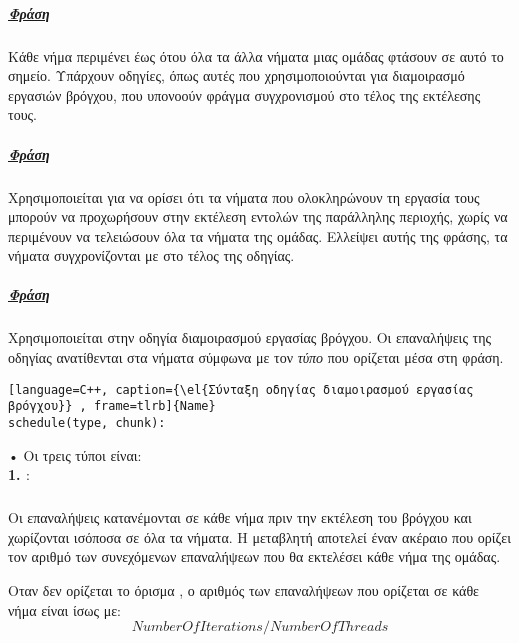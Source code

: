 \subparagraph{\underline{Φράση }}
\subparagraph{}
Kάθε νήμα περιμένει έως ότου όλα τα άλλα νήματα μιας ομάδας φτάσουν σε αυτό το σημείο. Υπάρχουν οδηγίες, όπως αυτές που
χρησιμοποιούνται για διαμοιρασμό εργασιών βρόγχου, που υπονοούν φράγμα συγχρονισμού \emph{} στο τέλος της
εκτέλεσης τους.

\subparagraph{\underline{Φράση }}
\subparagraph{}
Χρησιμοποιείται για να ορίσει ότι τα νήματα που ολοκληρώνουν τη εργασία τους μπορούν να προχωρήσουν στην εκτέλεση εντολών της παράλληλης περιοχής, χωρίς να περιμένουν να τελειώσουν όλα τα νήματα της ομάδας. Ελλείψει αυτής της φράσης, τα νήματα συγχρονίζονται με \emph{} στο τέλος της οδηγίας.
\subparagraph{\underline{Φράση }}
\subparagraph{}
Χρησιμοποιείται στην οδηγία διαμοιρασμού εργασίας βρόγχου. Οι επαναλήψεις της οδηγίας ανατίθενται στα νήματα σύμφωνα με τον \emph{τύπο} που ορίζεται μέσα στη φράση.
\begin{lstlisting}[language=C++, caption={\el{Σύνταξη οδηγίας διαμοιρασμού εργασίας βρόγχου}} , frame=tlrb]{Name}
schedule(type, chunk): 
\end{lstlisting}
    •  Οι τρεις τύποι \emph{} είναι\cite{jakacorner}:\\
\textbf{1. \emph{}}:
\subparagraph{}
Οι επαναλήψεις κατανέμονται σε κάθε νήμα πριν την εκτέλεση του βρόγχου και χωρίζονται ισόποσα σε όλα τα νήματα. Η
μεταβλητή \emph{} αποτελεί έναν ακέραιο που ορίζει τον αριθμό των συνεχόμενων επαναλήψεων που θα εκτελέσει
κάθε νήμα της ομάδας.
\clearpage

Οταν δεν ορίζεται το όρισμα \emph{}, ο αριθμός των επαναλήψεων που ορίζεται σε κάθε νήμα είναι ίσως με:
$$NumberOfIterations / NumberOfThreads$$

